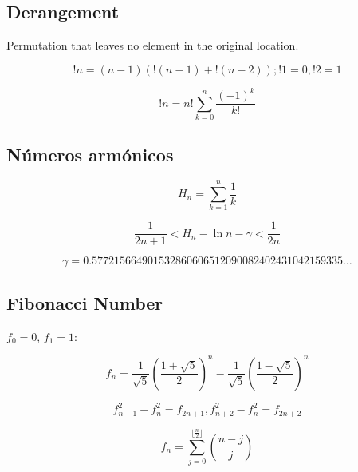       \subsection{Derangement} Permutation that leaves no element in the original location.

      \begin{equation*}
        !n = (n - 1)( !(n - 1) + !(n - 2) ); !1 = 0, !2 = 1
      \end{equation*}

      \begin{equation*}
        !n = n! \sum_{k = 0}^n \frac{(-1)^k}{k!}
      \end{equation*}

    \subsection{Números armónicos}

    \begin{equation*}
     H_n = \sum_{k = 1}^n \frac{1}{k}
    \end{equation*}

    \begin{equation*}
     \frac{1}{2n+1} < H_n - \ln n - \gamma < \frac{1}{2n}
    \end{equation*}

    \begin{equation*}
     \gamma = 0.57721 56649 01532 86060 65120 90082 40243 10421 59335 \ldots
    \end{equation*}

    \subsection{Fibonacci Number} $f_0 = 0$, $f_1 = 1$:

    \begin{equation*}
     f_n = \frac{1}{\sqrt{5}}(\frac{1 + \sqrt{5}}{2})^n - \frac{1}{\sqrt{5}}(\frac{1 - \sqrt{5}}{2})^n
    \end{equation*}

    \begin{equation*}
     f_{n+1}^2 + f_n^2 = f_{2n + 1}, 
     f_{n+2}^2 - f_n^2 = f_{2n + 2}
    \end{equation*}

    \begin{equation*}
     f_n = \sum_{j = 0}^{\lfloor \frac{n}{2} \rfloor} \binom{n-j}{j}
    \end{equation*}

